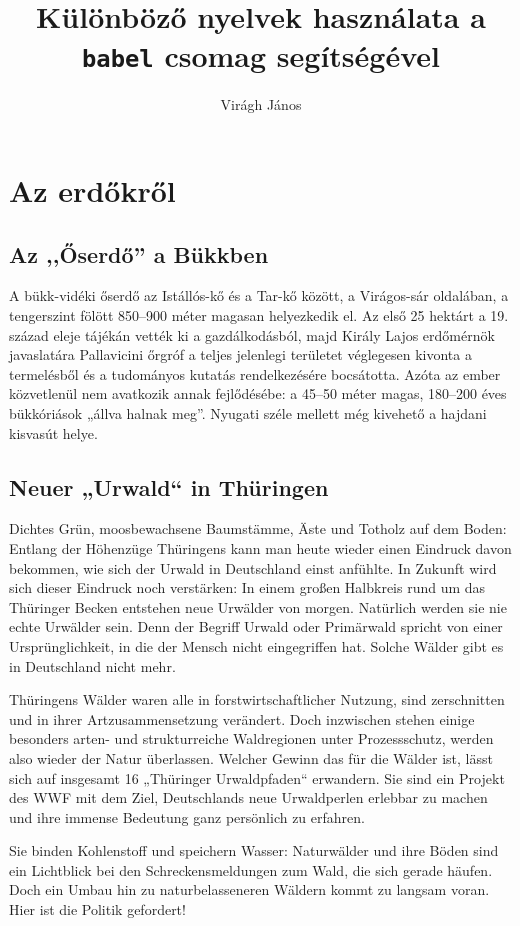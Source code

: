 \documentclass{article}
\title{Különböző nyelvek használata a \texttt{babel} csomag segítségével}
\author{Virágh János}
\begin{document}
\section{Az erdőkről}

\subsection{Az ,,Őserdő'' a Bükkben}

A bükk-vidéki őserdő az Istállós-kő és a Tar-kő között, a Virágos-sár oldalában, a tengerszint fölött 850–900 méter magasan helyezkedik el. Az első 25 hektárt a 19. század eleje tájékán vették ki a gazdálkodásból, majd Király Lajos erdőmérnök javaslatára Pallavicini őrgróf a teljes jelenlegi területet véglegesen kivonta a termelésből és a tudományos kutatás rendelkezésére bocsátotta. Azóta az ember közvetlenül nem avatkozik annak fejlődésébe: a 45–50 méter magas, 180–200 éves bükkóriások „állva halnak meg”. Nyugati széle mellett még kivehető a hajdani kisvasút helye. 


\subsection{Neuer „Urwald“ in Thüringen}

Dichtes Grün, moosbewachsene Baumstämme, Äste und Totholz auf dem Boden: Entlang der Höhenzüge Thüringens kann man heute wieder einen Eindruck davon bekommen, wie sich der Urwald in Deutschland einst anfühlte. In Zukunft wird sich dieser Eindruck noch verstärken: In einem großen Halbkreis rund um das Thüringer Becken entstehen neue Urwälder von morgen. Natürlich werden sie nie echte Urwälder sein. Denn der Begriff Urwald oder Primärwald spricht von einer Ursprünglichkeit, in die der Mensch nicht eingegriffen hat. Solche Wälder gibt es in Deutschland nicht mehr. 

Thüringens Wälder waren alle in forstwirtschaftlicher Nutzung, sind zerschnitten und in ihrer Artzusammensetzung verändert. Doch inzwischen stehen einige besonders arten- und strukturreiche Waldregionen unter Prozessschutz, werden also wieder der Natur überlassen. Welcher Gewinn das für die Wälder ist, lässt sich auf insgesamt 16 „Thüringer Urwaldpfaden“ erwandern. Sie sind ein Projekt des WWF mit dem Ziel, Deutschlands neue Urwaldperlen erlebbar zu machen und ihre immense Bedeutung ganz persönlich zu erfahren. 

Sie binden Kohlenstoff und speichern Wasser: Naturwälder und ihre Böden sind ein Lichtblick bei den Schreckensmeldungen zum Wald, die sich gerade häufen. Doch ein Umbau hin zu naturbelasseneren Wäldern kommt zu langsam voran. Hier ist die Politik gefordert!
\end{document}
